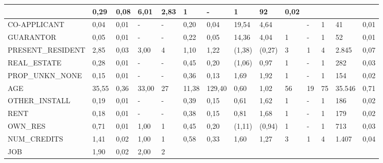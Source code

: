 \begin{table}[]
\begin{tabular}{|p{2.6cm}|p{0.75cm}|p{0.6cm}|p{0.75cm}|p{0.6cm}|p{0.75cm}|p{1.2cm}|p{0.6cm}|p{0.65cm}|p{0.7cm}|p{0.45cm}|p{0.65cm}|p{0.85cm}|p{0.55cm}|}
	    &{\tiny 0,29}&{\tiny 0,08}&{\tiny 6,01}&{\tiny 2,83}
	    &{\tiny 1}&{\tiny -}&{\tiny 1}&{\tiny 92}&{\tiny 0,02}\\ \hline
		{\tiny CO-APPLICANT}
		&{\tiny 0,04}&{\tiny 0,01}&{\tiny -}&{\tiny -}
		&{\tiny 0,20}&{\tiny 0,04}&{\tiny 19,54}&{\tiny 4,64}
		&{\tiny }&{\tiny -}&{\tiny 1}&{\tiny 41}&{\tiny 0,01}\\ \hline
		{\tiny GUARANTOR}
		&{\tiny 0,05}&{\tiny 0,01}&{\tiny -}&{\tiny -}
		&{\tiny 0,22}&{\tiny 0,05}&{\tiny 14,36}&{\tiny 4,04}
	    &{\tiny 1}&{\tiny -}&{\tiny 1}&{\tiny 52}&{\tiny 0,01}\\ \hline
		{\tiny PRESENT\_RESIDENT}
		&{\tiny 2,85}&{\tiny 0,03}&{\tiny 3,00}&{\tiny 4}
		&{\tiny 1,10}&{\tiny 1,22}&{\tiny (1,38)}&{\tiny (0,27)}
		&{\tiny 3}&{\tiny 1}&{\tiny 4}&{\tiny 2.845}&{\tiny 0,07}\\ \hline
		{\tiny REAL\_ESTATE}
		&{\tiny 0,28}&{\tiny 0,01}&{\tiny -}&{\tiny -}
		&{\tiny 0,45}&{\tiny 0,20}&{\tiny (1,06)}&{\tiny 0,97}
		&{\tiny 1}&{\tiny -}&{\tiny 1}&{\tiny 282}& {\tiny 0,03}\\ \hline
		{\tiny PROP\_UNKN\_NONE}
		&{\tiny 0,15}&{\tiny 0,01}&{\tiny -}&{\tiny -}
		&{\tiny 0,36}&{\tiny 0,13}&{\tiny 1,69}&{\tiny 1,92}
		&{\tiny 1}&{\tiny -}&{\tiny 1}&{\tiny 154}&{\tiny 0,02}\\ \hline
		{\tiny AGE}
		&{\tiny 35,55}&{\tiny 0,36}&{\tiny 33,00}&{\tiny 27}
		&{\tiny 11,38}&{\tiny 129,40}&{\tiny 0,60}&{\tiny 1,02}
		&{\tiny 56}&{\tiny 19}&{\tiny 75}&{\tiny 35.546}&{\tiny 0,71}\\ \hline
		{\tiny OTHER\_INSTALL}
		&{\tiny 0,19}&{\tiny 0,01}&{\tiny -}&{\tiny -}
		&{\tiny 0,39}&{\tiny 0,15}&{\tiny 0,61}&{\tiny 1,62}
		&{\tiny 1}&{\tiny -}&{\tiny 1}&{\tiny 186}&{\tiny 0,02}\\ \hline
		{\tiny RENT}
		&{\tiny 0,18}&{\tiny 0,01}&{\tiny -}&{\tiny -}
		&{\tiny 0,38}&{\tiny 0,15}&{\tiny 0,81}&{\tiny 1,68}
		&{\tiny 1}&{\tiny -}&{\tiny 1}&{\tiny 179}&{\tiny 0,02}\\ \hline
		{\tiny OWN\_RES}
		&{\tiny 0,71}&{\tiny 0,01}&{\tiny 1,00}&{\tiny 1}
		&{\tiny 0,45}&{\tiny 0,20}&{\tiny (1,11)}&{\tiny (0,94)}
		&{\tiny 1}&{\tiny -}&{\tiny 1}&{\tiny 713}&{\tiny 0,03}\\ \hline
		{\tiny NUM\_CREDITS}
		&{\tiny 1,41}&{\tiny 0,02}&{\tiny 1,00}&{\tiny 1}
		&{\tiny 0,58}&{\tiny 0,33}&{\tiny 1,60}&{\tiny 1,27}&
		{\tiny 3}&{\tiny 1}&{\tiny 4}&{\tiny 1.407}&{\tiny 0,04}\\ \hline
		{\tiny JOB}
		&{\tiny 1,90}&{\tiny 0,02}&{\tiny 2,00}&{\tiny 2}

\end{tabular}
\end{table}

